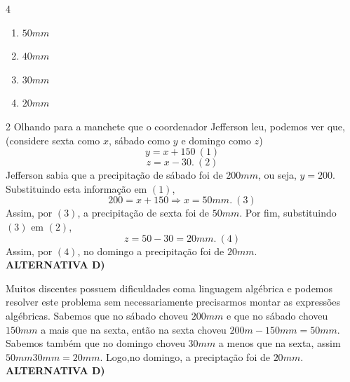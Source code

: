         \begin{multicols}{4}
            \begin{enumerate}[label=\alph*)]
                \item $50mm$
                \item $40mm$
                \item $30mm$
                \item $20mm$
            \end{enumerate}
        \end{multicols}
\begin{solucoes}{2}
\solucao
    Olhando para a manchete que o coordenador Jefferson leu, podemos ver que, (considere sexta como $x$, sábado como $y$ e domingo como $z$)
        \begin{equation*}
            y=x+150 \ (1)
        \end{equation*}
        \begin{equation*}
              z=x-30. \ (2)
        \end{equation*}
        Jefferson sabia que a precipitação de sábado foi de $200mm$, ou seja, $y=200$. Substituindo esta informação em $(1)$,
        \begin{equation*}
            200=x+150 \Longrightarrow x=50mm. \ (3)
        \end{equation*}
        Assim, por $(3)$, a precipitação de sexta foi de $50mm$. Por fim, substituindo $
        (3)$ em $(2)$,
        \begin{equation*}
            z=50-30=20mm. \ (4)
        \end{equation*}
Assim, por $(4)$, no domingo a precipitação foi de $20mm$. \\
    \textbf{ALTERNATIVA D)}

\solucao

Muitos discentes possuem dificuldades coma linguagem algébrica e podemos resolver este problema sem necessariamente precisarmos montar as expressões algébricas. Sabemos que no sábado choveu $200mm$ e que no sábado choveu $150mm$ a mais que na sexta, então na sexta choveu $200m-150mm=50mm$. Sabemos também que no domingo choveu $30mm$ a menos que na sexta, assim $50mm30mm=20mm$. Logo,no domingo, a preciptação foi de $20mm$.   \\
    \textbf{ALTERNATIVA D)}

\end{solucoes}

